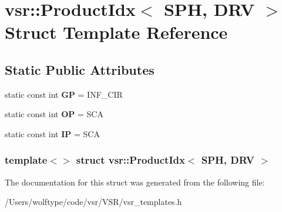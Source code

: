 \hypertarget{structvsr_1_1_product_idx_3_01_s_p_h_00_01_d_r_v_01_4}{\section{vsr\-:\-:Product\-Idx$<$ S\-P\-H, D\-R\-V $>$ Struct Template Reference}
\label{structvsr_1_1_product_idx_3_01_s_p_h_00_01_d_r_v_01_4}
}
\subsection*{Static Public Attributes}
\begin{DoxyCompactItemize}
\item 
\hypertarget{structvsr_1_1_product_idx_3_01_s_p_h_00_01_d_r_v_01_4_aaca8295bf5e159bfd0d83eb0abab866c}{static const int {\bfseries G\-P} = I\-N\-F\-\_\-\-C\-I\-R}\label{structvsr_1_1_product_idx_3_01_s_p_h_00_01_d_r_v_01_4_aaca8295bf5e159bfd0d83eb0abab866c}

\item 
\hypertarget{structvsr_1_1_product_idx_3_01_s_p_h_00_01_d_r_v_01_4_ad8c9d835b5b28e357cac68ffdc962fd9}{static const int {\bfseries O\-P} = S\-C\-A}\label{structvsr_1_1_product_idx_3_01_s_p_h_00_01_d_r_v_01_4_ad8c9d835b5b28e357cac68ffdc962fd9}

\item 
\hypertarget{structvsr_1_1_product_idx_3_01_s_p_h_00_01_d_r_v_01_4_ac9a5516e5f0f84dbf98f2a2f6d56fc8f}{static const int {\bfseries I\-P} = S\-C\-A}\label{structvsr_1_1_product_idx_3_01_s_p_h_00_01_d_r_v_01_4_ac9a5516e5f0f84dbf98f2a2f6d56fc8f}

\end{DoxyCompactItemize}
\subsubsection*{template$<$$>$ struct vsr\-::\-Product\-Idx$<$ S\-P\-H, D\-R\-V $>$}



The documentation for this struct was generated from the following file\-:\begin{DoxyCompactItemize}
\item 
/\-Users/wolftype/code/vsr/\-V\-S\-R/vsr\-\_\-templates.\-h\end{DoxyCompactItemize}
